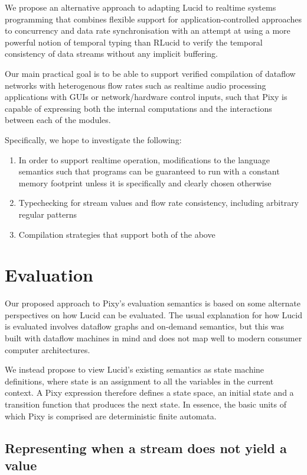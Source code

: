 \documentclass{scrartcl}
\begin{document}
    We propose an alternative approach to adapting Lucid to realtime systems programming that combines flexible support for application-controlled approaches to concurrency and data rate synchronisation with an attempt at using a more powerful notion of temporal typing than RLucid to verify the temporal consistency of data streams without any implicit buffering.
    
    Our main practical goal is to be able to support verified compilation of dataflow networks with heterogenous flow rates such as realtime audio processing applications with GUIs or network/hardware control inputs, such that Pixy is capable of expressing both the internal computations and the interactions between each of the modules.

    Specifically, we hope to investigate the following:
    \begin{enumerate}
        \item In order to support realtime operation, modifications to the language semantics such that programs can be guaranteed to run with a constant memory footprint unless it is specifically and clearly chosen otherwise
        \item Typechecking for stream values and flow rate consistency, including arbitrary regular patterns
        \item Compilation strategies that support both of the above
    \end{enumerate}

    \section{Evaluation}

    Our proposed approach to Pixy's evaluation semantics is based on some alternate perspectives on how Lucid can be evaluated. The usual explanation for how Lucid is evaluated involves dataflow graphs and on-demand semantics, but this was built with dataflow machines in mind and does not map well to modern consumer computer architectures.

    We instead propose to view Lucid's existing semantics as state machine definitions, where state is an assignment to all the variables in the current context. A Pixy expression therefore defines a state space, an initial state and a transition function that produces the next state. In essence, the basic units of which Pixy is comprised are deterministic finite automata.
    
    \subsection{Representing when a stream does not yield a value}
    
\end{document}
